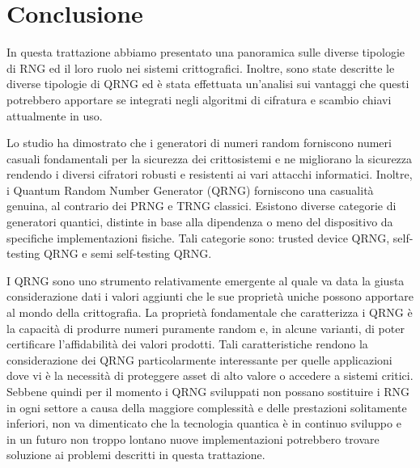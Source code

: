 \chapter{Conclusione}
In questa trattazione abbiamo presentato una panoramica sulle diverse tipologie di RNG ed il loro ruolo nei sistemi crittografici. Inoltre, sono state descritte le diverse tipologie di QRNG ed è stata effettuata un'analisi sui vantaggi che questi potrebbero apportare se integrati negli algoritmi di cifratura e scambio chiavi attualmente in uso. 

Lo studio ha dimostrato che i generatori di numeri random forniscono numeri casuali fondamentali per la sicurezza dei crittosistemi e ne migliorano la sicurezza rendendo i diversi cifratori robusti e resistenti ai vari attacchi informatici. Inoltre, i Quantum Random Number Generator (QRNG) forniscono una casualità genuina, al contrario dei PRNG e TRNG classici. Esistono diverse categorie di generatori quantici, distinte in base alla dipendenza o meno del dispositivo da specifiche implementazioni fisiche. Tali categorie sono: trusted device QRNG, self-testing QRNG e semi self-testing QRNG.

I QRNG sono uno strumento relativamente emergente al quale va data la giusta considerazione dati i valori aggiunti che le sue proprietà uniche possono apportare al mondo della crittografia. La proprietà fondamentale che caratterizza i QRNG è la capacità di produrre numeri puramente random e, in alcune varianti, di poter certificare l'affidabilità dei valori prodotti. Tali caratteristiche rendono la considerazione dei QRNG particolarmente interessante per quelle applicazioni dove vi è la necessità di proteggere asset di alto valore o accedere a sistemi critici.
Sebbene quindi per il momento i QRNG sviluppati non possano sostituire i RNG in ogni settore a causa della maggiore complessità e delle prestazioni solitamente inferiori, non va dimenticato che la tecnologia quantica è in continuo sviluppo e in un futuro non troppo lontano nuove implementazioni potrebbero trovare soluzione ai problemi descritti in questa trattazione.